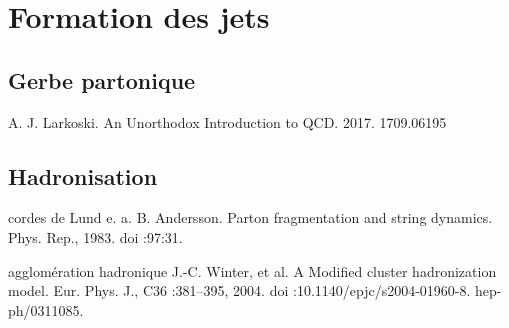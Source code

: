 \section{Formation des jets}

\subsection{Gerbe partonique}
A. J. Larkoski. An Unorthodox Introduction to QCD. 2017.
1709.06195

\subsection{Hadronisation}

cordes de Lund
e. a. B. Andersson. Parton fragmentation and string dynamics. Phys. Rep., 1983.
doi :97:31.

agglomération hadronique
J.-C. Winter, et al. A Modified cluster hadronization model. Eur. Phys. J.,
C36 :381–395, 2004. doi :10.1140/epjc/s2004-01960-8. hep-ph/0311085.